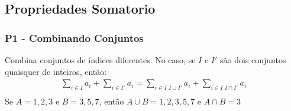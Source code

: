 \documentclass{article}
\begin{document}
\subsection{Propriedades Somatorio}
\subsubsection{P1 - Combinando Conjuntos}
Combina conjuntos de índices diferentes. No caso, se $I$ e $I'$ são dois conjuntos
quaisquer de inteiros, então:
\begin{equation}
    \begin{aligned}
        \sum_{i \in I}a_i + \sum_{i \in I'}a_i = \sum_{i \in I \,\, I\cup I'}a_i + \sum_{i \in I \,\, I\cap I'}a_i \\
    \end{aligned}
\end{equation}
Se $A = {1, 2, 3}$ e $B = {3, 5, 7}$, então
$A \cup B = {1, 2, 3, 5, 7}$ e $A \cap B = {3}$
\end{document}
